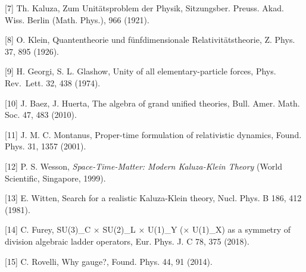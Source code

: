 \documentclass[
  a4paper,
]{ltjsarticle}
\begin{document}
{[}7{]} Th. Kaluza, Zum Unitätsproblem der Physik, Sitzungsber. Preuss.
Akad. Wiss. Berlin (Math. Phys.), 966 (1921).

{[}8{]} O. Klein, Quantentheorie und fünfdimensionale
Relativitätstheorie, Z. Phys. 37, 895 (1926).

{[}9{]} H. Georgi, S. L. Glashow, Unity of all elementary-particle
forces, Phys. Rev.~Lett. 32, 438 (1974).

{[}10{]} J. Baez, J. Huerta, The algebra of grand unified theories,
Bull. Amer. Math. Soc. 47, 483 (2010).

{[}11{]} J. M. C. Montanus, Proper-time formulation of relativistic
dynamics, Found. Phys. 31, 1357 (2001).

{[}12{]} P. S. Wesson, \emph{Space-Time-Matter: Modern Kaluza-Klein
Theory} (World Scientific, Singapore, 1999).

{[}13{]} E. Witten, Search for a realistic Kaluza-Klein theory, Nucl.
Phys. B 186, 412 (1981).

{[}14{]} C. Furey, SU(3)\_C × SU(2)\_L × U(1)\_Y (× U(1)\_X) as a
symmetry of division algebraic ladder operators, Eur. Phys. J. C 78, 375
(2018).

{[}15{]} C. Rovelli, Why gauge?, Found. Phys. 44, 91 (2014).
\end{document}
